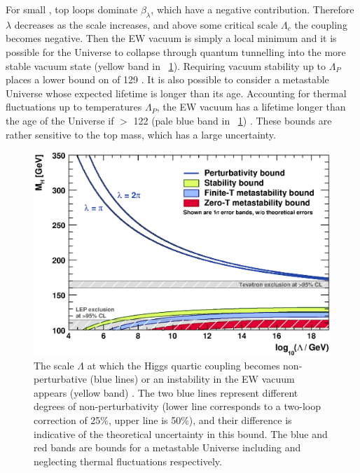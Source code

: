 For small \mH, top loops dominate $\beta_{\lambda}$, which have a negative 
contribution. Therefore $\lambda$ decreases as the scale increases, and above some 
critical scale $\Lambda_c$ the coupling becomes negative. Then the \ac{EW} 
vacuum is simply a local minimum and it is possible for the Universe to collapse through
quantum tunnelling into the more stable vacuum state (yellow band in 
\Figure~\ref{fig:theory_constraints}). Requiring vacuum stability up to $\Lambda_{P}$ 
places a lower bound on \mH of \unit{129}{\GeV} \cite{Ellis:2009}. It is also possible 
to consider a metastable Universe whose expected lifetime is longer than its age.
Accounting for thermal fluctuations up to temperatures \about $\Lambda_{P}$, the \ac{EW}
vacuum has a lifetime longer than the age of the Universe if \mH $>$ \unit{122}{\GeV} 
(pale blue band in \Figure~\ref{fig:theory_constraints}) \cite{Ellis:2009}. These bounds 
are rather sensitive to the top mass, which has a large uncertainty.

\begin{figure}
	\includegraphics[width=\mediumfigwidth]{tex/motivation/theory_constraints}
	\caption{The scale $\Lambda$ at which the Higgs quartic coupling becomes 
	non-perturbative (blue lines) or an instability in the \ac{EW} vacuum appears
	(yellow band) \cite{Ellis:2009}. The two blue lines represent different degrees of 
	non-perturbativity (lower line corresponds to a two-loop correction of 25\%, upper 
	line is 50\%), and their difference is indicative of the theoretical uncertainty in 
	this bound. The blue and red bands are bounds for a metastable Universe including and
	neglecting thermal fluctuations respectively.}
	\label{fig:theory_constraints}
\end{figure}
